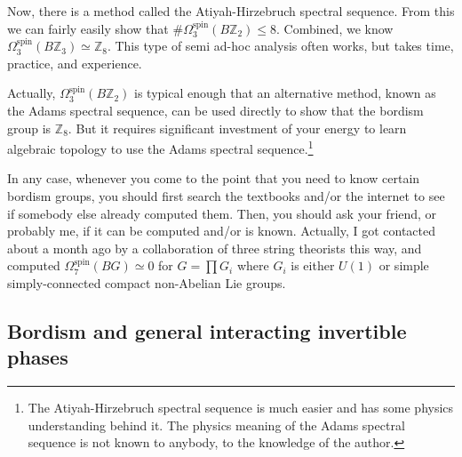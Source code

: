 \documentclass[12pt]{article}
\numberwithin{equation}{section}
\numberwithin{figure}{section}
\theoremstyle{remark}
\def\bZ{\mathbb{Z}}
\begin{document}
Now, there is a method called the Atiyah-Hirzebruch spectral sequence.
From this we can fairly easily show that $\# \Omega^\text{spin}_3(B\bZ_2) \le 8$.
Combined, we know $\Omega^\text{spin}_3(B\bZ_3)\simeq \bZ_8$.
This type of semi ad-hoc analysis often works, but takes time, practice, and experience.

Actually, $\Omega^\text{spin}_3(B\bZ_2)$ is typical enough
that an alternative method, known as the Adams spectral sequence,
can be used directly to show that the bordism group is $\bZ_8$.
But it requires significant investment of your energy to learn algebraic topology 
to use the Adams spectral sequence.\footnote{%
The Atiyah-Hirzebruch spectral sequence is much easier and has some physics understanding behind it.
The physics meaning of the Adams spectral sequence is not known to anybody, to the knowledge of the author.
}

In any case, whenever you come to the point that you need to know certain bordism groups,
you should first search the textbooks and/or the internet to see if somebody else already computed them.
Then, you should ask your friend, or probably me, if it can be computed and/or is known.
Actually, I got contacted about a month ago by a collaboration of three string theorists this way,
and computed $\Omega^\text{spin}_7(BG)\simeq 0$ for $G=\prod G_i$ where $G_i$ is either $U(1)$
or simple simply-connected compact non-Abelian Lie groups.


\subsection{Bordism and general interacting invertible phases}
\end{document}
